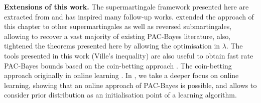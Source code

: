 \textbf{Extensions of this work.} The supermartingale framework presented here are extracted from \citet{haddouche2023pac} and has inspired many follow-up works. \citet{chugg2023unified} extended the approach of this chapter to other supermartingales as well as reversed submartingales, allowing to recover a vast majority of existing PAC-Bayes literature, also, \citet{rodriguez2023more} tightened the theorems presented here by allowing the optimisation in $\lambda$. The tools presented in this work (\eg Ville's inequality) are also useful to obtain fast rate PAC-Bayes bounds based on the coin-betting approach \citet{jang2023tight,kuzborskij2024better}. The coin-betting approach originally in online learning \citep{orabona2016coin}. In , we take a deeper focus on online learning, showing that an online approach of PAC-Bayes is possible, and allows to consider prior distribution as an initialisation point of a learning algorithm.
  